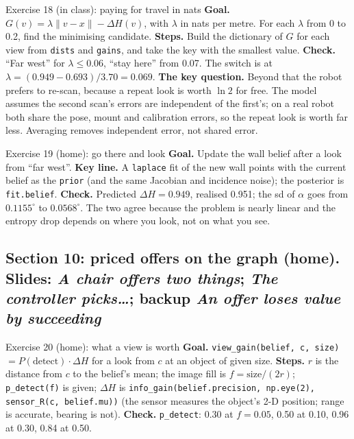\documentclass[11pt]{article}
\begin{document}
\begin{labhelp}{Exercise 18 (in class): paying for travel in nats}
\textbf{Goal.} $G(v)=\lambda\lVert v-x\rVert-\Delta H(v)$, with $\lambda$ in nats per metre. For each $\lambda$ from 0 to 0.2, find the minimising candidate. \textbf{Steps.} Build the dictionary of $G$ for each view from \texttt{dists} and \texttt{gains}, and take the key with the smallest value. \textbf{Check.} ``Far west'' for $\lambda\le0.06$, ``stay here'' from 0.07. The switch is at $\lambda=(0.949-0.693)/3.70=0.069$. \textbf{The key question.} Beyond that the robot prefers to re-scan, because a repeat look is worth $\ln2$ for free. The model assumes the second scan's errors are independent of the first's; on a real robot both share the pose, mount and calibration errors, so the repeat look is worth far less. Averaging removes independent error, not shared error.
\end{labhelp}

\begin{labhelp}{Exercise 19 (home): go there and look}
\textbf{Goal.} Update the wall belief after a look from ``far west''. \textbf{Key line.} A \texttt{laplace} fit of the new wall points with the current belief as the \texttt{prior} (and the same Jacobian and incidence noise); the posterior is \texttt{fit.belief}. \textbf{Check.} Predicted $\Delta H=0.949$, realised 0.951; the sd of $\alpha$ goes from $0.1155^\circ$ to $0.0568^\circ$. The two agree because the problem is nearly linear and the entropy drop depends on where you look, not on what you see.
\end{labhelp}

\subsection*{Section 10: priced offers on the graph (home). Slides: \emph{A chair offers two things}; \emph{The controller picks\ldots}; backup \emph{An offer loses value by succeeding}}

\begin{labhelp}{Exercise 20 (home): what a view is worth}
\textbf{Goal.} \texttt{view\_gain(belief, c, size)} $=P(\text{detect})\cdot\Delta H$ for a look from $c$ at an object of given size. \textbf{Steps.} $r$ is the distance from $c$ to the belief's mean; the image fill is $f=\text{size}/(2r)$; \texttt{p\_detect(f)} is given; $\Delta H$ is \texttt{info\_gain(belief.precision, np.eye(2), sensor\_R(c, belief.mu))} (the sensor measures the object's 2-D position; range is accurate, bearing is not). \textbf{Check.} \texttt{p\_detect}: 0.30 at $f=0.05$, 0.50 at 0.10, 0.96 at 0.30, 0.84 at 0.50.
\end{labhelp}
\end{document}

